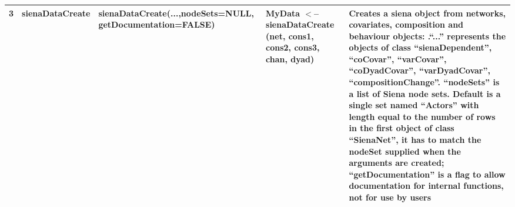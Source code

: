 \documentclass[a4paper,fleqn,11pt]{article}
\newcommand{\+}{\, + \,}
\begin{document}
\begin{landscape}
\begin{small}
\begin{longtable}{c | p{2.4cm} | p{4.5cm} | p{4.0cm} | p{9.0cm} }

3 & sienaDataCreate & sienaDataCreate(...,\newline nodeSets=NULL, \newline
getDocumentation=FALSE) &
MyData $<$-- \newline
sienaDataCreate (net, \newline cons1, cons2, cons3, \newline
chan, dyad) & Creates a siena object from networks, covariates,
composition and behaviour objects: .``...''  represents the objects of class
``sienaDependent'', ``coCovar'', ``varCovar'', ``coDyadCovar'', ``varDyadCovar'',
``compositionChange''. ``nodeSets'' is a list of Siena node sets. Default is a
single set named ``Actors'' with length equal to the number of rows in the
first object of class ``SienaNet'', it has to match the nodeSet supplied when
the arguments are created; ``getDocumentation'' is a flag to allow
documentation for internal functions,  not for use by users\\
\hline



\end{longtable}
\end{small}
\end{landscape}
\end{document}
